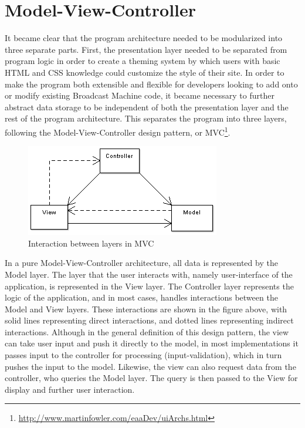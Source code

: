 \documentclass[a4paper,12pt]{report}
\begin{document}
\section{Model-View-Controller}
It became clear that the program architecture needed to be modularized into three separate parts. First, the presentation layer needed to 
be separated from program logic in order to create a theming system by which users with basic HTML and CSS knowledge could customize the style of their site. In order to make the program both extensible and flexible for developers looking to add onto or modify existing Broadcast Machine code, it became necessary to further abstract data storage to be independent of both the presentation layer and the rest of the program architecture. This separates the program into three layers, following the Model-View-Controller design pattern, or MVC\footnote{\url{http://www.martinfowler.com/eaaDev/uiArchs.html}}.


\begin{figure}[h]
\begin{center}
\includegraphics[scale=0.6]{./images/mvc.png}
\end{center}
\caption{Interaction between layers in MVC}
\end{figure}
In a pure Model-View-Controller architecture, all data is represented by the Model layer. The layer that the user interacts with, namely user-interface of the application, is represented in the View layer. The Controller layer represents the logic of the application, and in most cases, handles interactions between the Model and View layers. These interactions are shown in the figure above, with solid lines representing direct interactions, and dotted lines representing indirect interactions. Although in the general definition of this design pattern, the view can take user input and push it directly to the model, in most implementations it passes input to the controller for processing (input-validation), which in turn pushes the input to the model. Likewise, the view can also request data from the controller, who queries the Model layer. The query is then passed to the View for display and further user interaction.
\end{document}
